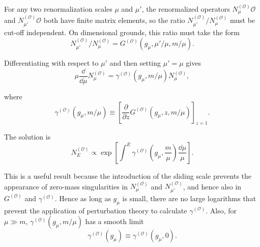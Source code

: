 For any two renormalization scales $\mu$ and $\mu'$, the renormalized
operators $N_\mu^{(\mathcal O)}\mathcal O$ and
$N_{\mu'}^{(\mathcal O)}\mathcal O$ both have finite matrix elements, so the
ratio $N_{\mu'}^{(\mathcal O)}/N_\mu^{(\mathcal O)}$ must be cut-off
independent. On dimensional grounds, this ratio must take the form
\begin{equation}
N_{\mu'}^{(\mathcal O)}/N_\mu^{(\mathcal O)}
=G^{(\mathcal O)}(g_\mu,\mu'/\mu,m/\mu).
\tag{18.2.24}\label{eq:18.2.24}
\end{equation}
\par\noindent
Differentiating with respect to $\mu'$ and then setting $\mu'=\mu$ gives
\begin{equation}
\mu\frac{\dd}{\dd\mu}N_\mu^{(\mathcal O)}
=\gamma^{(\mathcal O)}(g_\mu,m/\mu)N_\mu^{(\mathcal O)},
\tag{18.2.25}\label{eq:18.2.25}
\end{equation}
\par\noindent
where
\begin{equation}
\gamma^{(\mathcal O)}(g_\mu,m/\mu)
\equiv\left[\frac{\partial}{\partial z}
G^{(\mathcal O)}(g_\mu,z,m/\mu)\right]_{z=1}.
\tag{18.2.26}\label{eq:18.2.26}
\end{equation}
\par\noindent
The solution is
\begin{equation}
N_E^{(\mathcal O)}\propto
\exp\left[\int^E\gamma^{(\mathcal O)}
\left(g_\mu,\frac{m}{\mu}\right)\frac{\dd\mu}{\mu}\right].
\tag{18.2.27}\label{eq:18.2.27}
\end{equation}
\par\noindent
This is a useful result because the introduction of the sliding scale
prevents the appearance of zero-mass singularities in
$N_\mu^{(\mathcal O)}$ and $N_{\mu'}^{(\mathcal O)}$, and hence also in
$G^{(\mathcal O)}$ and $\gamma^{(\mathcal O)}$. Hence as long as $g_\mu$ is
small, there are no large logarithms that prevent the application of
perturbation theory to calculate $\gamma^{(\mathcal O)}$. Also, for
$\mu\gg m$, $\gamma^{(\mathcal O)}(g_\mu,m/\mu)$ has a smooth limit
\begin{equation}
\gamma^{(\mathcal O)}(g_\mu)
\equiv\gamma^{(\mathcal O)}(g_\mu,0).
\tag{18.2.28}\label{eq:18.2.28}
\end{equation}
\par\noindent


